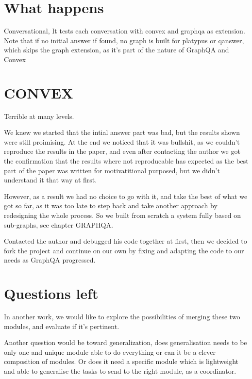 \section{What happens}

Conversational,
It tests each conversation with convex and graphqa as extension.
Note that if no initial answer if found, no graph is built for platypus or qanswer, which skips the graph extension, as it's part of the nature of GraphQA and Convex


\section{CONVEX}
Terrible at many levels.

We knew we started that the intial answer part was bad, but the results shown were still proimising. At the end we noticed that it was bullshit, as we couldn't reproduce the results in the paper, and even after contacting the author we got the confirmation that the results where not reproducable has expected as the best part of the paper was written for motivatitional purposed, but we didn't understand it that way at first.

However, as a result we had no choice to go with it, and take the best of what we got so far, as it was too late to step back and take another approach by redesigning the whole process. 
So we built from scratch a system fully based on sub-graphs, see chapter GRAPHQA.

Contacted the author and debugged his code together at first, then we decided to fork the project and continue on our own by fixing and adapting the code to our needs as GraphQA progressed.



\section{Questions left}


In another work, we would like to explore the possibilities of merging these two modules, and evaluate if it's pertinent.

Another question would be toward generalization, does generalisation needs to be only one and unique module able to do everything or can it be a clever composition of modules. Or does it need a specific module which is lightweight and able to generalise the tasks to send to the right module, as a coordinator.

